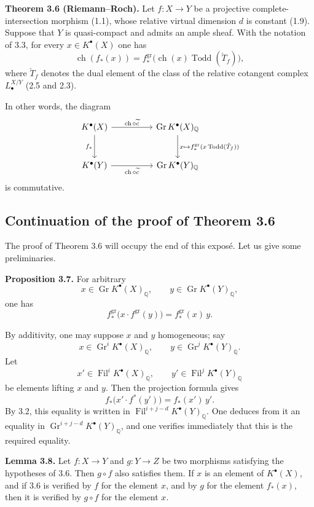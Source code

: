\documentclass[11pt]{article}
\newcommand{\Gr}{\operatorname{Gr}}
\newcommand{\Fil}{\operatorname{Fil}}
\newcommand{\ch}{\operatorname{ch}}
\newcommand{\Todd}{\operatorname{Todd}}
\providecommand{\ch}{\operatorname{ch}}
\providecommand{\Todd}{\operatorname{Todd}}
\providecommand{\Gr}{\operatorname{Gr}}
\providecommand{\Gr}{\operatorname{G}}
\begin{document}
\textbf{Theorem 3.6 (Riemann--Roch).} Let $f:X\to Y$ be a projective complete-intersection morphism (1.1), whose relative virtual dimension $d$ is constant (1.9). Suppose that $Y$ is quasi-compact and admits an ample sheaf. With the notation of 3.3, for every $x\in K^{\bullet}(X)$ one has
\[
\ch(f_*(x))=f^{\mathrm{gr}}_*\bigl(\ch(x)\Todd(\check T_f)\bigr),
\]
where $\check T_f$ denotes the dual element of the class of the relative cotangent complex $L^{X/Y}_\bullet$ (2.5 and 2.3).

In other words, the diagram
\[
\begin{tikzcd}[column sep=huge,row sep=large]
K^{\bullet}(X) \arrow[r,"\ch\circ\widetilde c"] \arrow[d,"f_*"'] & \Gr K^{\bullet}(X)_{\mathbb Q} \arrow[d,"x\mapsto f^{\mathrm{gr}}_*(x\Todd(\check T_f))"]\\
K^{\bullet}(Y) \arrow[r,"\ch\circ\widetilde c"'] & \Gr K^{\bullet}(Y)_{\mathbb Q}
\end{tikzcd}
\]
is commutative.



\subsection*{Continuation of the proof of Theorem 3.6}

The proof of Theorem 3.6 will occupy the end of this exposé. Let us give some preliminaries.

\textbf{Proposition 3.7.} For arbitrary
\[
x\in \Gr K^{\bullet}(X)_{\mathbb Q},\qquad
y\in \Gr K^{\bullet}(Y)_{\mathbb Q},
\]
one has
\[
 f^{\mathrm{gr}}_*\bigl(x\cdot f^{\mathrm{gr}}(y)\bigr)
 =
 f^{\mathrm{gr}}_*(x)\,y .
\]

By additivity, one may suppose \(x\) and \(y\) homogeneous; say
\[
x\in \Gr^iK^{\bullet}(X)_{\mathbb Q},\qquad
y\in \Gr^jK^{\bullet}(Y)_{\mathbb Q}.
\]
Let
\[
x'\in \Fil^iK^{\bullet}(X)_{\mathbb Q},\qquad
y'\in \Fil^jK^{\bullet}(Y)_{\mathbb Q}
\]
be elements lifting \(x\) and \(y\). Then the projection formula gives
\[
 f_*\bigl(x'\cdot f^*(y')\bigr)=f_*(x')\,y'.
\]
By 3.2, this equality is written in
\(\Fil^{i+j-d}K^{\bullet}(Y)_{\mathbb Q}\). One deduces from it an equality in
\(\Gr^{i+j-d}K^{\bullet}(Y)_{\mathbb Q}\), and one verifies immediately that this is the required equality.

\textbf{Lemma 3.8.} Let \(f:X\to Y\) and \(g:Y\to Z\) be two morphisms satisfying the hypotheses of 3.6. Then \(g\circ f\) also satisfies them. If \(x\) is an element of \(K^{\bullet}(X)\), and if 3.6 is verified by \(f\) for the element \(x\), and by \(g\) for the element \(f_*(x)\), then it is verified by \(g\circ f\) for the element \(x\).
\end{document}
